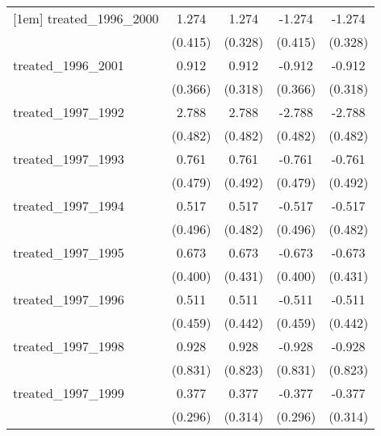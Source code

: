 {\begin{tabular}{l*{4}{c}}
[1em]
treated\_1996\_2000&       1.274\sym{**} &       1.274\sym{***}&      -1.274\sym{**} &      -1.274\sym{***}\\
            &     (0.415)         &     (0.328)         &     (0.415)         &     (0.328)         \\
[1em]
treated\_1996\_2001&       0.912\sym{*}  &       0.912\sym{**} &      -0.912\sym{*}  &      -0.912\sym{**} \\
            &     (0.366)         &     (0.318)         &     (0.366)         &     (0.318)         \\
[1em]
treated\_1997\_1992&       2.788\sym{***}&       2.788\sym{***}&      -2.788\sym{***}&      -2.788\sym{***}\\
            &     (0.482)         &     (0.482)         &     (0.482)         &     (0.482)         \\
[1em]
treated\_1997\_1993&       0.761         &       0.761         &      -0.761         &      -0.761         \\
            &     (0.479)         &     (0.492)         &     (0.479)         &     (0.492)         \\
[1em]
treated\_1997\_1994&       0.517         &       0.517         &      -0.517         &      -0.517         \\
            &     (0.496)         &     (0.482)         &     (0.496)         &     (0.482)         \\
[1em]
treated\_1997\_1995&       0.673         &       0.673         &      -0.673         &      -0.673         \\
            &     (0.400)         &     (0.431)         &     (0.400)         &     (0.431)         \\
[1em]
treated\_1997\_1996&       0.511         &       0.511         &      -0.511         &      -0.511         \\
            &     (0.459)         &     (0.442)         &     (0.459)         &     (0.442)         \\
[1em]
treated\_1997\_1998&       0.928         &       0.928         &      -0.928         &      -0.928         \\
            &     (0.831)         &     (0.823)         &     (0.831)         &     (0.823)         \\
[1em]
treated\_1997\_1999&       0.377         &       0.377         &      -0.377         &      -0.377         \\
            &     (0.296)         &     (0.314)         &     (0.296)         &     (0.314)         \\

\end{tabular}}

